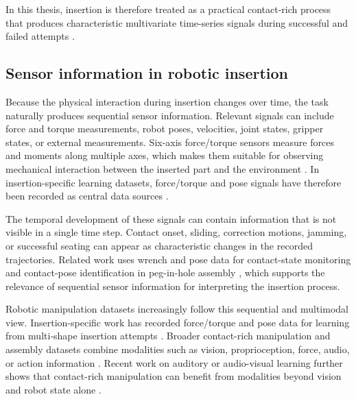 In this thesis, insertion is therefore treated as a practical contact-rich process that produces characteristic multivariate time-series signals during successful and failed attempts \cite{magistrisExperimentalForceTorqueDataset2018,beltran-hernandezLearningForceControl2020}.

\subsection{Sensor information in robotic insertion}

Because the physical interaction during insertion changes over time, the task naturally produces sequential sensor information. Relevant signals can include force and torque measurements, robot poses, velocities, joint states, gripper states, or external measurements. Six-axis force/torque sensors measure forces and moments along multiple axes, which makes them suitable for observing mechanical interaction between the inserted part and the environment \cite{liMultiaxisForceTorque2025,qiaoRoboticPegHoleInsertion1993,tangAutonomousAlignmentPeg2016}. In insertion-specific learning datasets, force/torque and pose signals have therefore been recorded as central data sources \cite{magistrisExperimentalForceTorqueDataset2018}.

The temporal development of these signals can contain information that is not visible in a single time step. Contact onset, sliding, correction motions, jamming, or successful seating can appear as characteristic changes in the recorded trajectories. Related work uses wrench and pose data for contact-state monitoring \cite{jasimContactstateMonitoringForceguided2014} and contact-pose identification in peg-in-hole assembly \cite{jinContactPoseIdentification2021a}, which supports the relevance of sequential sensor information for interpreting the insertion process.

Robotic manipulation datasets increasingly follow this sequential and multimodal view. Insertion-specific work has recorded force/torque and pose data for learning from multi-shape insertion attempts \cite{magistrisExperimentalForceTorqueDataset2018}. Broader contact-rich manipulation and assembly datasets combine modalities such as vision, proprioception, force, audio, or action information \cite{sliwowskiREASSEMBLEMultimodalDataset2025,fangRH20TComprehensiveRobotic2024}. Recent work on auditory or audio-visual learning further shows that contact-rich manipulation can benefit from modalities beyond vision and robot state alone \cite{thankarajThatSoundsRight2023,mejiaHearingTouchAudioVisual2024b}.

